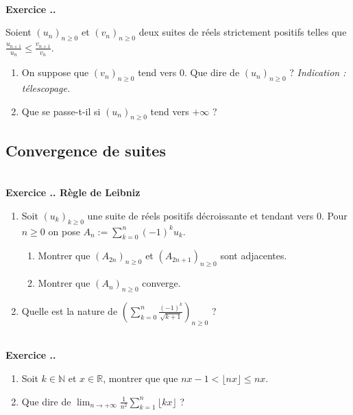 \documentclass{article}
\newcommand{\mb}[1]{\mathbb{#1}}
\newcounter{exo}
\newcommand{\exercice}[1][\null]{\textbf{\\ Exercice \thesection.\theexo. #1} \addtocounter{exo}{1}}
\begin{document}
\exercice

Soient $(u_n)_{n \ge 0}$ et $(v_n)_{n \ge 0}$ deux suites de réels strictement positifs telles que $\frac{u_{n+1}}{u_n} \le \frac{v_{n+1}}{v_n}$.

\begin{enumerate}

\item On suppose que $(v_n)_{n \ge 0}$ tend vers $0$. Que dire de $(u_n)_{n \ge 0}$ ? \emph{Indication : télescopage.}

\item Que se passe-t-il si $(u_n)_{n \ge 0}$ tend vers $+ \infty$ ?

\end{enumerate}


\subsection{Convergence de suites}

\exercice[Règle de Leibniz]

\begin{enumerate}

\item Soit $(u_k)_{k \ge 0}$ une suite de réels positifs décroissante et tendant vers $0$. Pour $n \ge 0$ on pose $\displaystyle A_n := \sum_{k=0}^n (-1)^{k} u_k$.


\begin{enumerate}

\item Montrer que $(A_{2n})_{n \ge 0}$ et $(A_{2n+1})_{n \ge 0}$ sont adjacentes.

\item Montrer que $(A_n)_{n \ge 0}$ converge.

\end{enumerate}

\item Quelle est la nature de $\displaystyle \left(\sum_{k=0}^n \frac{(-1)^{k}}{\sqrt{k+1}}\right)_{n \ge 0}$ ?

\end{enumerate}





\exercice

\begin{enumerate}

\item Soit $k \in \mb{N}$ et $x \in \mb{R}$, montrer que que $nx -1 < \lfloor nx \rfloor \le nx$.

\item Que dire de $\displaystyle \lim_{n \to + \infty} \frac{1}{n^2} \sum_{k=1}^n \lfloor kx \rfloor$ ?
\end{enumerate}
\end{document}
